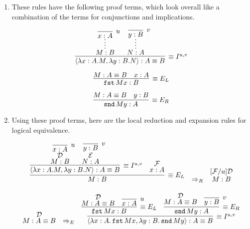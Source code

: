 \documentclass[11pt,letterpaper]{article}
\DeclareMathOperator{\fst}{\mathtt{fst}}
\DeclareMathOperator{\snd}{\mathtt{snd}}
\begin{document}
\begin{enumerate}
    \item These rules have the following proof terms, which look overall like a
        combination of the terms for conjunctions and implications.

        $$
        \infer[\equiv I^{u,v}]{\equivproofterm{x}{A}{M}{y}{B}{N}}{
            \infer*{M : B}{
                \infer[u]{x : A}{}
            }
            &
            \infer*{N : A}{
                \infer[v]{y : B}{}
            }
        }
        $$

        $$
        \infer[\equiv E_L]{\fst M x : B}{
            M : A \equiv B
            &
            x : A
        }
        $$

        $$
        \infer[\equiv E_R]{\snd M y : A}{
            M : A \equiv B
            &
            y : B
        }
        $$

    \item Using these proof terms, here are the local reduction and expansion
        rules for logical equivalence.

        $$
        \begin{array}{c c c}
            \infer[\equiv E_L]{M : B}{
                \infer[\equiv I^{u, v}]{\equivproofterm{x}{A}{M}{y}{B}{N}}{
                    \deduce[\mathcal{D}]{M:B}{
                        \infer[u]{x:A}{}
                    }
                    &
                    \deduce[\mathcal{E}]{N:A}{
                        \infer[v]{y:B}{}
                    }
                }
                &
                \deduce[\mathcal{F}]{x : A}{}
            }
            &
            \Rightarrow_R
            &
            \deduce[\text{[}\mathcal{F} / u \text{]} \mathcal{D}]{M:B}{}
        \end{array}
        $$

        $$
        \begin{array}{c c c}
            \deduce[\mathcal{D}]{M : A \equiv B}{}
            &
            \Rightarrow_E
            &
            \infer[\equiv I^{u, v}]{
                \equivproofterm{x}{A}{\fst M x}{y}{B}{\snd M y}
            }{
                \infer[\equiv E_L]{\fst M x : B}{
                    \deduce[\mathcal{D}]{M : A \equiv B}{}
                    &
                    \infer[u]{x : A}{}
                }
                &
                \infer[\equiv E_R]{\snd M y : A}{
                    \deduce[\mathcal{D}]{M : A \equiv B}{}
                    &
                    \infer[v]{y : B}{}
                }
            }
        \end{array}
        $$


\end{enumerate}
\end{document}
